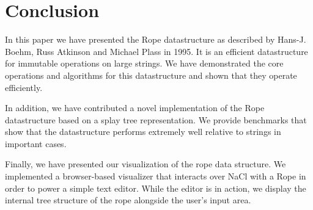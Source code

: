 \documentclass[12pt]{article}
\begin{document}
\section{Conclusion}

In this paper we have presented the Rope datastructure as described by Hans-J. Boehm, Russ Atkinson and Michael Plass in 1995. It is an efficient datastructure for immutable operations on large strings. We have demonstrated the core operations and algorithms for this datastructure and shown that they operate efficiently.

In addition, we have contributed a novel implementation of the Rope datastructure based on a splay tree representation. We provide benchmarks that show that the datastructure performs extremely well relative to strings in important cases.

Finally, we have presented our visualization of the rope data structure. We implemented a browser-based visualizer that interacts over NaCl with a Rope in order to power a simple text editor. While the editor is in action, we display the internal tree structure of the rope alongside the user's input area. 
\end{document}
